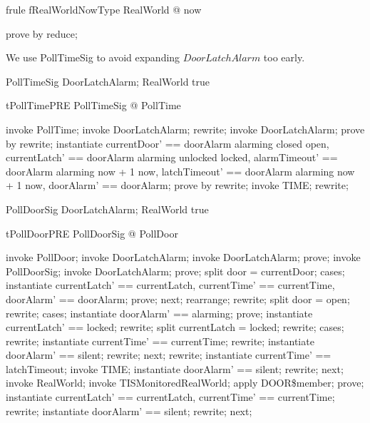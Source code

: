 \begin{theorem}{frule fRealWorldNowType}
   \forall RealWorld @ now 
\end{theorem}

\begin{zproof}[fRealWorldNowType]
prove by reduce;
\end{zproof}



We use PollTimeSig to avoid expanding $DoorLatchAlarm$ too early.
\begin{schema}{PollTimeSig}
   DoorLatchAlarm; RealWorld
\where
   true
\end{schema}

\begin{theorem}{tPollTimePRE}
    \forall PollTimeSig @ \pre PollTime
\end{theorem}

\begin{zproof}[tPollTimePRE]
invoke PollTime;
invoke \Delta DoorLatchAlarm;
rewrite;
invoke DoorLatchAlarm;
prove by rewrite;
instantiate
  currentDoor' == \IF doorAlarm \neq alarming \THEN closed \ELSE open,
  currentLatch' == \IF doorAlarm \neq alarming \THEN unlocked \ELSE locked,
  alarmTimeout' == \IF doorAlarm \neq alarming \THEN now + 1 \ELSE now,
  latchTimeout' == \IF doorAlarm \neq alarming \THEN now + 1 \ELSE now,
  doorAlarm' == doorAlarm;
prove by rewrite;
invoke TIME;
rewrite;
\end{zproof}

\begin{schema}{PollDoorSig}
   DoorLatchAlarm; RealWorld
\where
true
\end{schema}

\begin{theorem}{tPollDoorPRE}
    \forall PollDoorSig @ \pre PollDoor
\end{theorem}

\begin{zproof}[tPollDoorPRE]
invoke PollDoor;
invoke \Delta DoorLatchAlarm;
invoke DoorLatchAlarm;
prove;
invoke PollDoorSig;
invoke DoorLatchAlarm;
prove;
split door = currentDoor;
cases;
instantiate currentLatch' == currentLatch,
   currentTime' == currentTime, doorAlarm' == doorAlarm;
prove;
next;
rearrange;
rewrite;
split door = open;
rewrite;
cases;
instantiate doorAlarm' == alarming;
prove;
instantiate currentLatch' == locked;
rewrite;
split currentLatch = locked;
rewrite;
cases;
rewrite;
instantiate currentTime' == currentTime;
rewrite;
instantiate doorAlarm' == silent;
rewrite;
next;
rewrite;
instantiate currentTime' == latchTimeout;
invoke TIME;
instantiate doorAlarm' == silent;
rewrite;
next;
invoke RealWorld;
invoke TISMonitoredRealWorld;
apply DOOR\$member;
prove;
instantiate currentLatch' == currentLatch, currentTime' == currentTime;
rewrite;
instantiate doorAlarm' == silent;
rewrite;
next;
\end{zproof}

